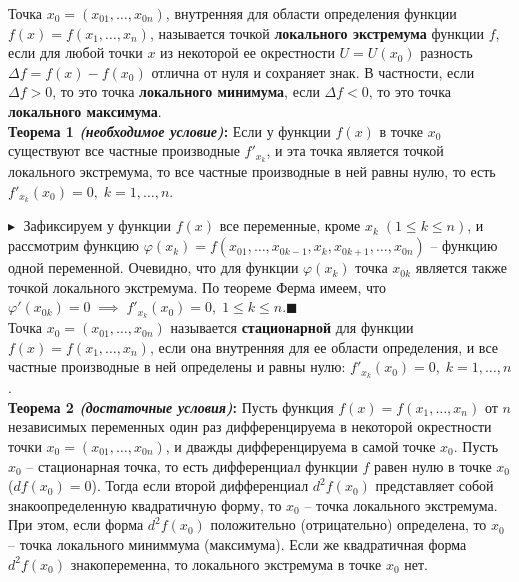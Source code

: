  Точка $x_0 = (x_{01}, \ldots, x_{0n})$, внутренняя для области определения функции $f(x) = f(x_1, \ldots, x_n)$, называется точкой \textbf{локального экстремума} функции $f$, если для любой точки $x$ из некоторой ее окрестности $U = U(x_0)$ разность $\Delta f = f(x) - f(x_0)$ отлична от нуля и сохраняет знак. В частности, если $\Delta f> 0$, то это точка \textbf{локального минимума}, если $\Delta f < 0$, то это точка \textbf{локального максимума}.\\

\textbf{Теорема 1 \textit{(необходимое условие)}:} Если у функции $f(x)$ в точке $x_0$ существуют все частные производные $f'_{x_k}$, и эта точка является точкой локального экстремума, то все частные производные в ней равны нулю, то есть $f'_{x_k}(x_0) = 0, \; k = 1, \ldots, n$.

$\blacktriangleright\;$ Зафиксируем у функции $f(x)$ все переменные, кроме $x_k \;(1\leq k\leq n)$, и рассмотрим функцию $\varphi(x_k) = f(x_{01}, \ldots, x_{0 k-1}, x_k, x_{0 k+1}, \ldots, x_{0 n})$ -- функцию одной переменной. Очевидно, что для функции $\varphi(x_k)$ точка $x_{0k}$ является также точкой локального экстремума. По теореме Ферма имеем, что $\varphi'(x_{0k}) = 0 \;\implies\; f'_{x_k} (x_0) = 0, \; 1\leq k \leq n$.\;$\blacksquare$\\

 Точка $x_0 = (x_{01}, \ldots, x_{0n})$ называется \textbf{стационарной} для функции $f(x) = f(x_1, \ldots, x_n)$, если она внутренняя для ее области определения, и все частные производные в ней определены и равны нулю: $f'_{x_k}(x_0) = 0, \; k = 1, \ldots, n$.\\

\textbf{Теорема 2 \textit{(достаточные условия)}:} Пусть функция $f(x) = f(x_1, \ldots, x_n)$ от $n$ независимых переменных один раз дифференцируема в некоторой окрестности точки $x_0 = (x_{01}, \ldots, x_{0n})$, и дважды дифференцируема в самой точке $x_0$. Пусть $x_0$ -- стационарная точка, то есть дифференциал функции $f$ равен нулю в точке $x_0$ ($d f(x_0) = 0$). Тогда если второй дифференциал $d^2 f(x_0)$ представляет собой знакоопределенную квадратичную форму, то $x_0$ -- точка локального экстремума. При этом, если форма $d^2f(x_0)$ положительно (отрицательно) определена, то $x_0$ -- точка локального миниммума (максимума). Если же квадратичная форма $d^2 f(x_0)$ знакопеременна, то локального экстремума в точке $x_0$ нет.


